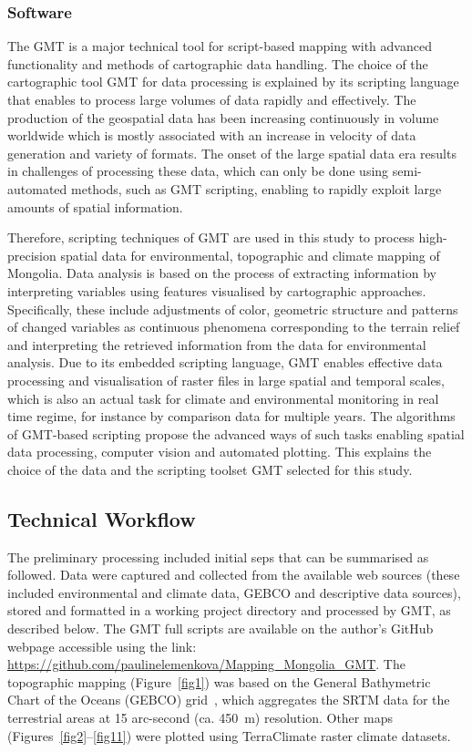\documentclass[geosciences,article,accept,pdftex,oneauthor]{Definitions/mdpi}
\begin{document}
\subsubsection{Software}
The GMT is a major technical tool for script-based mapping with advanced functionality and methods of cartographic data handling. The choice of the cartographic tool GMT for data processing is explained by its scripting language that enables to process large volumes of data rapidly and effectively. The production of the geospatial data has been increasing continuously in volume worldwide which is mostly associated with an increase in velocity of data generation and variety of formats. The onset of the large spatial data era results in challenges of processing these data, which can only be done using semi-automated methods, such as GMT scripting, enabling to rapidly exploit large amounts of spatial information. 

Therefore, scripting techniques of GMT are used in this study to process high-precision spatial data for environmental, topographic and climate mapping of Mongolia. Data analysis is based on the process of extracting information by interpreting variables using features visualised by cartographic approaches. Specifically, these include adjustments of color, geometric structure and patterns of changed variables as continuous phenomena corresponding to the terrain relief and interpreting the retrieved information from the data for environmental analysis. Due to its embedded scripting language, GMT enables effective data processing and visualisation of raster files in large spatial and temporal scales, which is also an actual task for climate and environmental monitoring in real time regime, for instance by comparison data for multiple years. The algorithms of GMT-based scripting propose the advanced ways of such tasks enabling spatial data processing, computer vision and automated plotting. This explains the choice of the data and the scripting toolset GMT selected for this study.

\subsection{Technical Workflow}
The preliminary processing included initial seps that can be summarised as followed. Data were captured and collected from the available web sources (these included environmental and climate data, GEBCO and descriptive data sources), stored and formatted in a working project directory and processed by GMT, as described below. The GMT full scripts are available on the author's GitHub webpage accessible using the link: \href{https://github.com/paulinelemenkova/Mapping_Mongolia_GMT}{https://github.com/paulinelemenkova/Mapping\_Mongolia\_GMT}. The topographic mapping (Figure~\ref{fig1}) was based on the General Bathymetric Chart of the Oceans (GEBCO) grid~\cite{Schenke2016}, which aggregates the SRTM data for the terrestrial areas at 15 arc-second (ca. \mbox{450 m}) resolution. Other maps (Figures~\ref{fig2}--\ref{fig11}) were plotted using TerraClimate raster climate datasets. 
\end{document}
